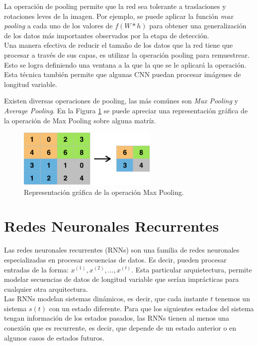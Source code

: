 	La operación de pooling permite que la red sea tolerante a traslaciones y rotaciones leves de la imagen. Por ejemplo, se puede aplicar la función \textit{max pooling} a cada uno de los valores de $f(W*h)$ para obtener una generalización de los datos más importantes observados por la etapa de detección. \\
	
	Una manera efectiva de reducir el tamaño de los datos que la red tiene que procesar a través de sus capas, es utilizar la operación pooling para remuestrear. Esto se logra definiendo una ventana a la que la que se le aplicará la operación. Esta técnica también permite que algunas CNN puedan procesar imágenes de longitud variable.

	Existen diversas operaciones de pooling, las más comúnes son \textit{Max Pooling} y \textit{Average Pooling}. En la Figura \ref{fig:max-pooling} se puede apreciar una representación gráfica de la operación de Max Pooling sobre alguna matríz.

	\begin{figure}[H]
		\centering
		\includegraphics[width=0.6\textwidth]{capitulo2/images/max_pooling}
		\caption{Representación gráfica de la operación Max Pooling.}
		\label{fig:max-pooling}
	\end{figure}
    
   	
\section{Redes Neuronales Recurrentes}

Las redes neuronales recurrentes (RNNs) son una familia de redes neuronales especializadas en procesar secuencias de datos. Es decir, pueden procesar entradas de la forma: $x^{(1)}, x^{(2)}, \dots, x^{(t)}$. Esta particular arquietectura, permite modelar secuencias de datos de longitud variable que serían imprácticas para cualquier otra arquitectura. \\

Las RNNs modelan sistemas dinámicos, es decir, que cada instante $t$ tenemos un sistema $s(t)$ con un estado diferente. Para que los siguientes estados del sistema tengan información de los estados pasados, las RNNs tienen al menos una conexión que es recurrente, es decir, que depende de un estado anterior o en algunos casos de estados futuros. \\

